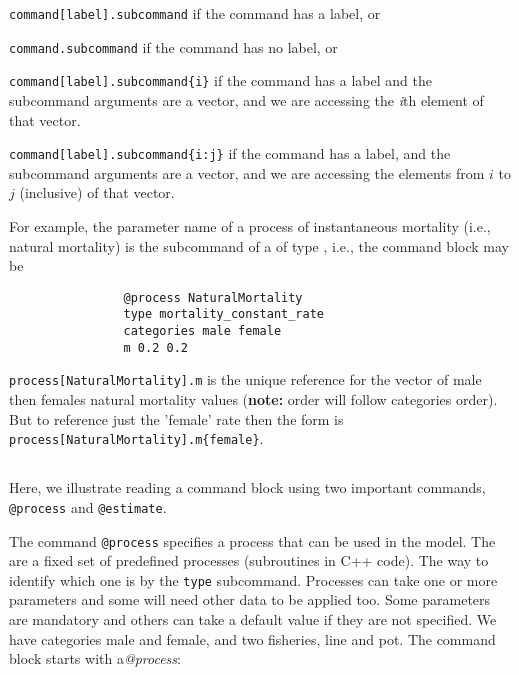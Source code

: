 \begin{description}
	\item \texttt{command[label].subcommand} if the command has a label, or
	\item \texttt{command.subcommand} if the command has no label, or
	\item \texttt{command[label].subcommand\{i\}} if the command has a label and the subcommand arguments are a vector, and we are accessing the  \emph{i}th element of that vector.
	\item \texttt{command[label].subcommand\{i:j\}} if the command has a label, and the subcommand arguments are a vector, and we are accessing the elements from $i$ to $j$ (inclusive) of that vector.
\end{description}

For example, the parameter name of a process of instantaneous mortality (i.e., natural mortality) is the subcommand  of a  of type , i.e., the command block may be

\small{\begin{verbatim}
				@process NaturalMortality
				type mortality_constant_rate
				categories male female
				m 0.2 0.2
\end{verbatim}}
%
\texttt{process[NaturalMortality].m} is the unique reference for the vector of male then females natural mortality values (\textbf{note:} order will follow categories order). But to reference just the 'female' rate then the form is
\texttt{process[NaturalMortality].m\{female\}}.

\subsection{\label{sec:Readingcommandblock}}

Here, we illustrate reading a command block using two important commands, \texttt{@process} and \texttt{@estimate}.

The command \texttt{@process} specifies a process that can be used in the model. The are a fixed set of predefined processes (subroutines in C++ code). The way to identify which one is by the \texttt{type} subcommand. Processes can take one or more parameters and some will need other data to be applied too. Some parameters are mandatory and others can take a default value if they are not specified.
We have categories male and female, and two fisheries, line and pot. The command block starts with a\textit{@process}:

